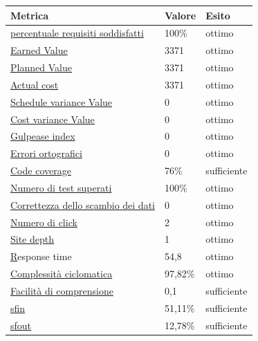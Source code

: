    \begin{longtabu} to \textwidth {| X[0.2,c m] | X[0.1,c m] | X[0.1,c m] |}
        \hline
        \textbf{Metrica} &
        \textbf{Valore} &
        \textbf{Esito}\\
        \hline
        \hyperlink{subsubsection.5.1.1}{percentuale requisiti soddisfatti}& 100\% & ottimo \\ 
        \hline
        \hyperlink{subsubsection.5.1.2}{Earned Value} & 3371 & ottimo  \\ 
        \hline
        \hyperlink{subsubsection.5.1.2}{Planned Value} & 3371 & ottimo  \\
        \hline
        \hyperlink{subsubsection.5.1.2}{Actual cost} & 3371 & ottimo  \\
        \hline
        \hyperlink{subsubsection.5.1.2}{Schedule variance Value} & 0 & ottimo  \\
        \hline
        \hyperlink{subsubsection.5.1.2}{Cost variance Value} & 0 & ottimo  \\
        \hline
        \hyperlink{subsubsection.5.2.1}{Gulpease index} & 0 & ottimo  \\
        \hline
        \hyperlink{subsubsection.5.2.2}{Errori ortografici} & 0 & ottimo  \\
        \hline
        \hyperlink{subsubsection.5.2.4}{Code coverage} & 76\% & sufficiente \\
        \hline
        \hyperlink{subsubsection.5.2.5}{Numero di test superati} & 100\% & ottimo \\
        \hline
        \hyperlink{subsubsection.5.3.1}{Correttezza dello scambio dei dati} & 0 & ottimo \\
        \hline
        \hyperlink{subsubsection.5.3.2}{Numero di click} & 2 & ottimo \\
        \hline
        \hyperlink{subsubsection.5.3.3}{Site depth} & 1 & ottimo \\
        \hline
        \hyperlink{subsubsection.5.3.3}Response time & 54,8 & ottimo \\
        \hline
        \hyperlink{subsubsection.5.3.5}{Complessità ciclomatica} & 97,82\% & ottimo \\
        \hline
        \hyperlink{subsubsection.5.3.6}{Facilità di comprensione} & 0,1 & sufficiente \\
        \hline
        \hyperlink{subsubsection.5.3.7}{sfin} & 51,11\% & sufficiente \\
        \hline
        \hyperlink{subsubsection.5.3.7}{sfout} & 12,78\% & sufficiente \\
        \hline
        
        \end{longtabu}

